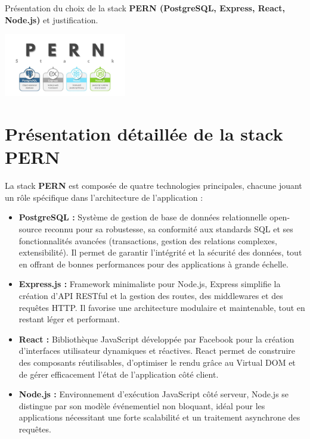 \documentclass[12pt,a4paper]{report}
\begin{document}
Présentation du choix de la stack \textbf{PERN (PostgreSQL, Express, React, Node.js)} et justification.  

\begin{center}
    \includegraphics[width=0.4\textwidth]{1_ptqverAyBpdfUDhrs2g_3A.jpg} %
\end{center}

\section*{Présentation détaillée de la stack PERN}

La stack \textbf{PERN} est composée de quatre technologies principales, chacune jouant un rôle spécifique dans l’architecture de l’application :

\begin{itemize}
    \item \textbf{PostgreSQL :} Système de gestion de base de données relationnelle open-source reconnu pour sa robustesse, sa conformité aux standards SQL et ses fonctionnalités avancées (transactions, gestion des relations complexes, extensibilité). Il permet de garantir l’intégrité et la sécurité des données, tout en offrant de bonnes performances pour des applications à grande échelle.
    \item \textbf{Express.js :} Framework minimaliste pour Node.js, Express simplifie la création d’API RESTful et la gestion des routes, des middlewares et des requêtes HTTP. Il favorise une architecture modulaire et maintenable, tout en restant léger et performant.
    \item \textbf{React :} Bibliothèque JavaScript développée par Facebook pour la création d’interfaces utilisateur dynamiques et réactives. React permet de construire des composants réutilisables, d’optimiser le rendu grâce au Virtual DOM et de gérer efficacement l’état de l’application côté client.
    \item \textbf{Node.js :} Environnement d’exécution JavaScript côté serveur, Node.js se distingue par son modèle événementiel non bloquant, idéal pour les applications nécessitant une forte scalabilité et un traitement asynchrone des requêtes.
\end{itemize}
\end{document}
